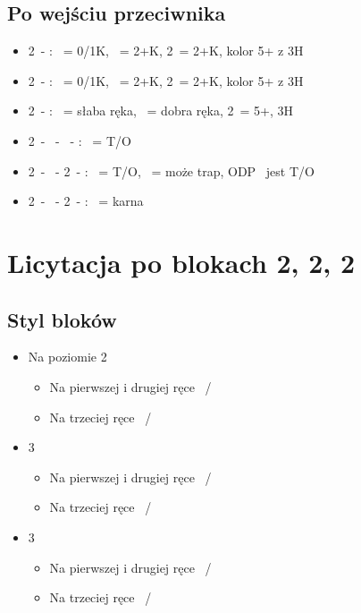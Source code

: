 \documentclass[12pt, a4paper]{article}
\begin{document}
\subsection{Po wejściu przeciwnika}
\begin{itemize}
    \item 2\clubs\ - \enemy{\dbl}: \rdbl\ = 0/1K, \pass\ = 2+K, 2\diams\hearts\spades\ = 2+K, kolor 5+ z 3H
    \item 2\clubs\ - \enemy{2\diams}: \dbl\ = 0/1K, \pass\ = 2+K, 2\hearts\spades\ = 2+K, kolor 5+ z 3H
    \item 2\clubs\ - \enemy{2\hearts+}: \dbl\ = słaba ręka, \pass\ = dobra ręka, 2\spades\ = 5+, 3H
    \item 2\clubs\ - \ - \pass\ - \enemy{\pass}: \dbl\ = T/O
    \item 2\clubs\ - \enemy{\pass}\ - 2\diams\ - : \dbl\ = T/O, \pass\ = może trap, ODP \dbl\ jest T/O 
    \item 2\clubs\ - \enemy{\pass}\ - 2\major\ - : \dbl\ = karna
\end{itemize}


\pagebreak
\section{Licytacja po blokach 2\diams, 2\hearts, 2\spades}
\subsection{Styl bloków}
\begin{itemize}
    \item Na poziomie 2
    \begin{itemize}
        \item Na pierwszej i drugiej ręce \ / 
        \item Na trzeciej ręce \ /  
    \end{itemize}
    
    \item 3\clubs
    \begin{itemize}
        \item Na pierwszej i drugiej ręce \ / 
        \item Na trzeciej ręce \ /  
    \end{itemize}

    \item 3\diams\hearts\spades
    \begin{itemize}
        \item Na pierwszej i drugiej ręce \ / 
        \item Na trzeciej ręce \ /  
    \end{itemize}
\end{itemize}
\end{document}
